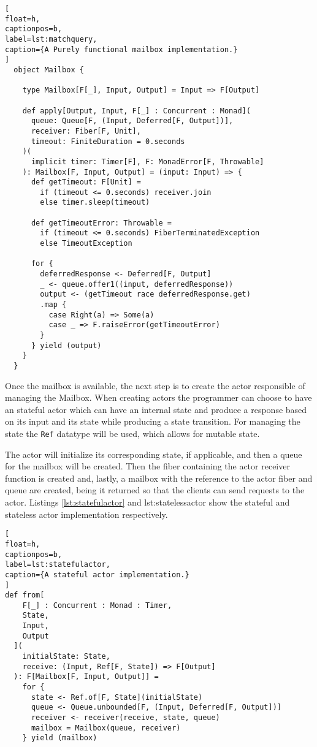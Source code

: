 \documentclass[../main.tex]{subfiles}
\begin{document}
\begin{lstlisting}[
float=h,
captionpos=b,
label=lst:matchquery,
caption={A Purely functional mailbox implementation.}
]
  object Mailbox {

    type Mailbox[F[_], Input, Output] = Input => F[Output]

    def apply[Output, Input, F[_] : Concurrent : Monad](
      queue: Queue[F, (Input, Deferred[F, Output])],
      receiver: Fiber[F, Unit],
      timeout: FiniteDuration = 0.seconds
    )(
      implicit timer: Timer[F], F: MonadError[F, Throwable]
    ): Mailbox[F, Input, Output] = (input: Input) => {
      def getTimeout: F[Unit] =
        if (timeout <= 0.seconds) receiver.join
        else timer.sleep(timeout)

      def getTimeoutError: Throwable =
        if (timeout <= 0.seconds) FiberTerminatedException
        else TimeoutException

      for {
        deferredResponse <- Deferred[F, Output]
        _ <- queue.offer1((input, deferredResponse))
        output <- (getTimeout race deferredResponse.get)
        .map {
          case Right(a) => Some(a)
          case _ => F.raiseError(getTimeoutError)
        }
      } yield (output)
    }
  }
\end{lstlisting}

Once the mailbox is available, the next step is to create the actor responsible
of managing the Mailbox. When creating actors the programmer can choose to have
an stateful actor which can have an internal state and produce a response based
on its input and its state while producing a state transition. For managing the
state the \texttt{Ref} datatype \autocite{Cats-effectCats.effect.concurrent.Ref} will be
used, which allows for mutable state.

The actor will initialize its corresponding state, if applicable, and then a queue
for the mailbox will be created. Then the fiber containing the actor receiver function is
created and, lastly, a mailbox with the reference to the actor fiber and queue are
created, being it returned so that the clients can send requests to the actor.
Listings \ref{lst:statefulactor} and {lst:statelessactor} show the
stateful and stateless actor implementation respectively.

\begin{lstlisting}[
float=h,
captionpos=b,
label=lst:statefulactor,
caption={A stateful actor implementation.}
]
def from[
    F[_] : Concurrent : Monad : Timer,
    State,
    Input,
    Output
  ](
    initialState: State,
    receive: (Input, Ref[F, State]) => F[Output]
  ): F[Mailbox[F, Input, Output]] =
    for {
      state <- Ref.of[F, State](initialState)
      queue <- Queue.unbounded[F, (Input, Deferred[F, Output])]
      receiver <- receiver(receive, state, queue)
      mailbox = Mailbox(queue, receiver)
    } yield (mailbox)
\end{lstlisting}
\end{document}
